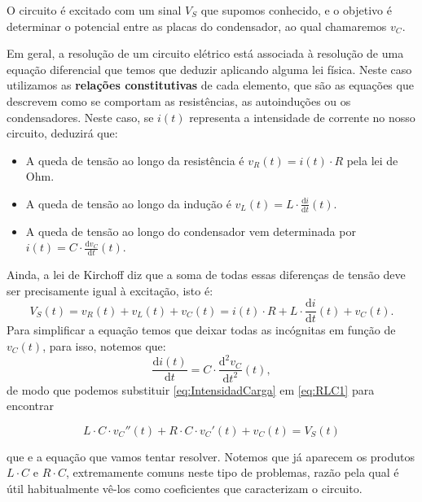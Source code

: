 O circuito é excitado com um sinal $V_S$ que supomos conhecido, e o
objetivo é determinar o potencial entre as placas do condensador, ao
qual chamaremos $v_C$.

Em geral, a resolução de um circuito elétrico está associada à
resolução de uma equação diferencial que temos que deduzir aplicando
alguma lei física. Neste caso utilizamos as \textbf{relações
  constitutivas} de cada elemento, que são as equações que descrevem
como se comportam as resistências, as autoinduções ou os
condensadores. Neste caso, se $i(t)$ representa a intensidade de
corrente no nosso circuito, deduzirá que:

\begin{itemize}
\item A queda de tensão ao longo da resistência é $v_R(t) = i(t) \cdot
  R$ pela lei de Ohm.
\item A queda de tensão ao longo da indução é $v_L(t) = L\cdot
  \frac{\text{d} i}{\text{d}t}(t)$.
\item A queda de tensão ao longo do condensador vem determinada por
  $i(t) = C\cdot \frac{\text{d}v_C}{\text{d}t}(t)$.
\end{itemize}

Ainda, a lei de Kirchoff diz que a soma de todas essas diferenças de
tensão deve ser precisamente igual à excitação, isto é:
\begin{equation}
  \label{eq:RLC1}
  V_{S}(t) = v_{R}(t) + v_{L}(t) + v_{C}(t) = i(t)\cdot R + L\cdot \frac{\text{d}i}{\text{d}t}(t) + v_C(t).
\end{equation}
Para simplificar a equação temos que deixar todas as incógnitas em
função de $v_C(t)$, para isso, notemos que:
\begin{equation}
  \label{eq:IntensidadCarga}
  \frac{\text{d}i(t)}{\text{d}t} = C\cdot \frac{\text{d}^2v_C}{\text{d}t^2}(t),
\end{equation}
de modo que podemos substituir \eqref{eq:IntensidadCarga} em
\eqref{eq:RLC1} para encontrar
\begin{mybox}\vspace{-5mm}
  \begin{equation}
    \label{eq:RLC}
    L\cdot C\cdot v_C''(t) + R\cdot C\cdot v_C'(t) + v_C(t) = V_S(t)
  \end{equation}
\end{mybox}
que e a equação que vamos tentar resolver. Notemos que já aparecem os
produtos $L\cdot C$ e $R\cdot C$, extremamente comuns neste tipo de
problemas, razão pela qual é útil habitualmente vê-los como
coeficientes que caracterizam o circuito.


